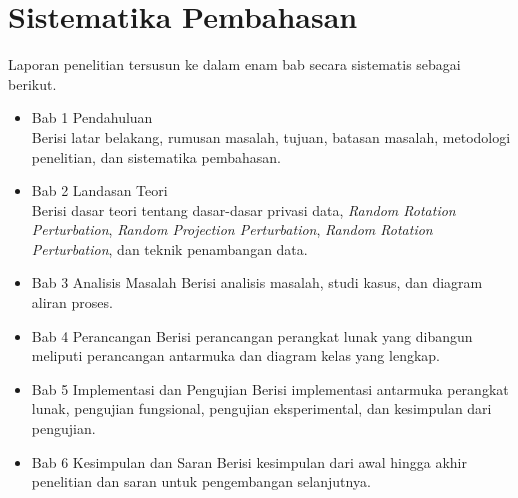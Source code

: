 \section{Sistematika Pembahasan}
\label{sec:sispem}
Laporan penelitian tersusun ke dalam enam bab secara sistematis sebagai berikut.
\begin{itemize}
    \item Bab 1 Pendahuluan\\
    Berisi latar belakang, rumusan masalah, tujuan, batasan masalah, metodologi penelitian, dan sistematika pembahasan.
    \item Bab 2 Landasan Teori\\
    Berisi dasar teori tentang dasar-dasar privasi data, \textit{Random Rotation Perturbation}, \textit{Random Projection Perturbation}, \textit{Random Rotation Perturbation}, dan teknik penambangan data.
    \item Bab 3 Analisis Masalah
    Berisi analisis masalah, studi kasus, dan diagram aliran proses.
    \item Bab 4 Perancangan
    Berisi perancangan perangkat lunak yang dibangun meliputi perancangan antarmuka dan diagram kelas yang lengkap.
    \item Bab 5 Implementasi dan Pengujian
    Berisi implementasi antarmuka perangkat lunak, pengujian fungsional, pengujian eksperimental, dan kesimpulan dari pengujian.
    \item Bab 6 Kesimpulan dan Saran
    Berisi kesimpulan dari awal hingga akhir penelitian dan saran untuk pengembangan selanjutnya.
\end{itemize}
